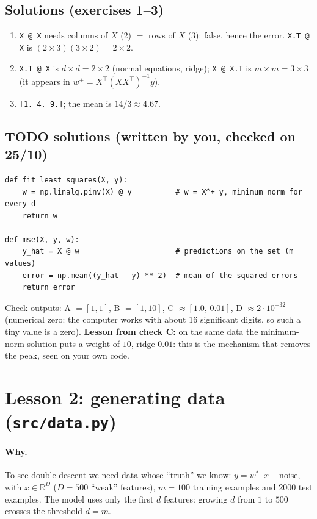 \documentclass[11pt,a4paper]{article}
\begin{document}
\subsection*{Solutions (exercises 1--3)}
\begin{enumerate}
  \item \texttt{X @ X} needs columns of $X$ ($2$) $=$ rows of $X$ ($3$): false, hence the error.
        \texttt{X.T @ X} is $(2\times 3)(3\times 2) = 2\times 2$.
  \item \texttt{X.T @ X} is $d\times d = 2\times 2$ (normal equations, ridge); \texttt{X @ X.T} is $m\times m = 3\times 3$
        (it appears in $w^{+} = X^\top(XX^\top)^{-1}y$).
  \item \texttt{[1. 4. 9.]}; the mean is $14/3 \approx 4.67$.
\end{enumerate}
\subsection*{TODO solutions (written by you, checked on 25/10)}
\begin{lstlisting}
def fit_least_squares(X, y):
    w = np.linalg.pinv(X) @ y          # w = X^+ y, minimum norm for every d
    return w

def mse(X, y, w):
    y_hat = X @ w                      # predictions on the set (m values)
    error = np.mean((y_hat - y) ** 2)  # mean of the squared errors
    return error
\end{lstlisting}
Check outputs: A $=[1,1]$, B $=[1,10]$, C $\approx[1.0,\,0.01]$, D $\approx 2\cdot10^{-32}$ (numerical zero: the computer
works with about 16 significant digits, so such a tiny value is a zero).
\textbf{Lesson from check C:} on the same data the minimum-norm solution puts a weight of $10$, ridge $0.01$:
this is the mechanism that removes the peak, seen on your own code.

\section{Lesson 2: generating data (\texttt{src/data.py})}
\paragraph{Why.} To see double descent we need data whose ``truth'' we know:
$y = w^{*\top}x + \text{noise}$, with $x \in \mathbb{R}^D$ ($D=500$ ``weak'' features), $m=100$ training examples
and $2000$ test examples. The model uses only the first $d$ features: growing $d$ from $1$ to $500$ crosses the threshold $d=m$.
\end{document}
